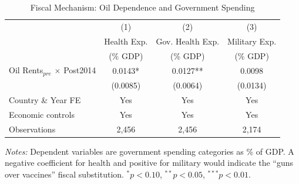 \begin{table}[H]
\centering
\caption{Fiscal Mechanism: Oil Dependence and Government Spending}
\label{tab:mechanism}
\begin{threeparttable}
\begin{tabular}{lccc}
\toprule
& (1) & (2) & (3) \\
& Health Exp. & Gov. Health Exp. & Military Exp. \\
& (\% GDP) & (\% GDP) & (\% GDP) \\
\midrule
Oil Rents$_{pre}$ $\times$ Post2014 & 0.0143* & 0.0127** & 0.0098 \\
& (0.0085) & (0.0064) & (0.0134) \\
\midrule
Country \& Year FE & Yes & Yes & Yes \\
Economic controls & Yes & Yes & Yes \\
Observations & 2,456 & 2,456 & 2,174 \\
\bottomrule
\end{tabular}
\begin{tablenotes}\small
\item \textit{Notes:} Dependent variables are government spending categories as \% of GDP. A negative coefficient for health and positive for military would indicate the ``guns over vaccines'' fiscal substitution. $^{*}p<0.10$, $^{**}p<0.05$, $^{***}p<0.01$.
\end{tablenotes}
\end{threeparttable}
\end{table}
